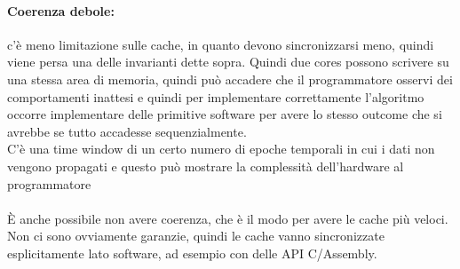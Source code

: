 \documentclass[12pt, oneside]{extbook} %
\begin{document}
\paragraph{Coerenza debole:} c'è meno limitazione sulle cache, in quanto devono sincronizzarsi meno, quindi viene persa una delle invarianti dette sopra. Quindi due cores possono scrivere su una stessa area di memoria, quindi può accadere che il programmatore osservi dei comportamenti inattesi e quindi per implementare correttamente l'algoritmo occorre implementare delle primitive software per avere lo stesso outcome che si avrebbe se tutto accadesse sequenzialmente.\\ C'è una time window di un certo numero di epoche temporali in cui i dati non vengono propagati e questo può mostrare la complessità dell'hardware al programmatore\\\\ È anche possibile non avere coerenza, che è il modo per avere le cache più veloci. Non ci sono ovviamente garanzie, quindi le cache vanno sincronizzate esplicitamente lato software, ad esempio con delle API C/Assembly.
\end{document}
